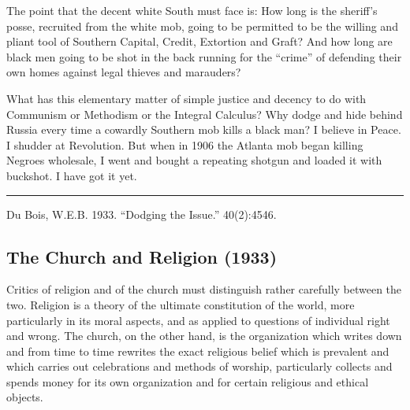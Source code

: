 \documentclass[letterpaper,10pt,english]{jupyterBook}
\begin{document}
\sphinxAtStartPar
The point that the decent white South must face is: How long is the sheriff’s posse, recruited from the white mob, going to be permitted to be the willing and pliant tool of Southern Capital, Credit, Extortion and Graft? And how long are black men going to be shot in the back running for the “crime” of defending their own homes against legal thieves and marauders?

\sphinxAtStartPar
What has this elementary matter of simple justice and decency to do with Communism or Methodism or the Integral Calculus? Why dodge and hide behind Russia every time a cowardly Southern mob kills a black man? I believe in Peace. I shudder at Revolution. But when in 1906 the Atlanta mob began killing Negroes wholesale, I went and bought a repeating shot\sphinxhyphen{}gun and loaded it with buckshot. I have got it yet.


\bigskip\hrule\bigskip


\sphinxAtStartPar
{} Du Bois, W.E.B. 1933. “Dodging the Issue.”  40(2):45\sphinxhyphen{}46.


\subsection{The Church and Religion (1933)}
\label{\detokenize{Volumes/40/10/church_and_religion:the-church-and-religion-1933}}\label{\detokenize{Volumes/40/10/church_and_religion::doc}}
\sphinxAtStartPar
Critics of religion and of the church must distinguish rather carefully between the two. Religion is a theory of the ultimate constitution of the world, more particularly in its moral aspects, and as applied to questions of individual right and wrong. The church, on the other hand, is the organization which writes down and from time to time rewrites the exact religious belief which is prevalent and which carries out celebrations and methods of worship, particularly collects and spends money for its own organization and for certain religious and ethical objects.
\end{document}
